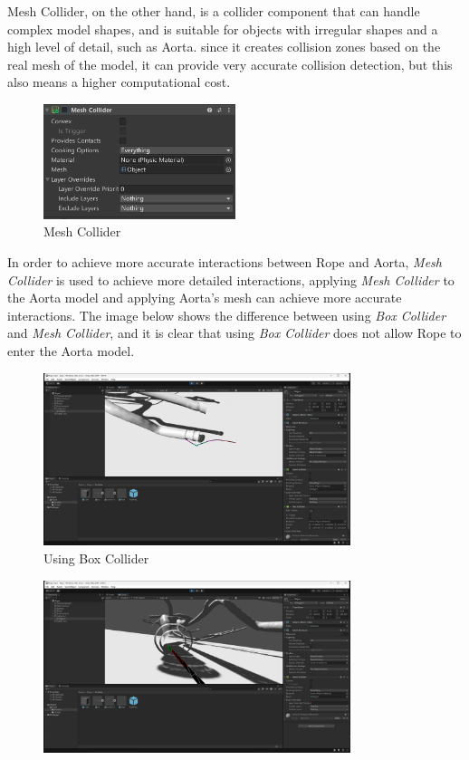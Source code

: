 \documentclass[12pt]{article}
\begin{document}
\begin{enumerate}
      Mesh Collider, on the other hand, is a collider component that can handle complex model shapes, and is suitable for objects with irregular shapes and a high level of detail, such as Aorta. since it creates collision zones based on the real mesh of the model, it can provide very accurate collision detection, but this also means a higher computational cost. \cite{UnityMeshCollider2024}
      \begin{figure}[H]
            \centering
            \includegraphics[width=0.5\textwidth]{mesh.png}
            \caption{Mesh Collider}
      \end{figure}
      In order to achieve more accurate interactions between Rope and Aorta, \emph{Mesh Collider} is used to achieve more detailed interactions, applying \emph{Mesh Collider} to the Aorta model and applying Aorta's mesh can achieve more accurate interactions. The image below shows the difference between using \emph{Box Collider} and \emph{Mesh Collider}, and it is clear that using \emph{Box Collider} does not allow Rope to enter the Aorta model.
      \begin{figure}[H]
            \centering
            \includegraphics[width=0.8\textwidth]{with box.png}
            \caption{Using Box Collider}
      \end{figure}
      \begin{figure}[H]
            \centering
            \includegraphics[width=0.8\textwidth]{with mesh.png}

\end{figure}
\end{enumerate}
\end{document}
